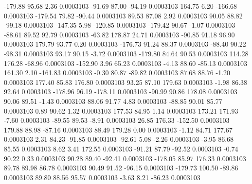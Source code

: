      -179.88       95.68        2.36     0.0003103
      -91.69       87.00      -94.19     0.0003103
      164.75        6.20     -166.68     0.0003103
     -179.54       79.82      -90.44     0.0003103
       89.53       87.08        2.92     0.0003103
       90.05       88.82      -99.18     0.0003103
     -147.35        5.98     -120.85     0.0003103
     -179.42       90.67       -1.07     0.0003103
      -88.61       89.52       92.79     0.0003103
      -63.82      178.87       24.71     0.0003103
      -90.85       91.18       96.90     0.0003103
      179.79       93.77        0.20     0.0003103
     -176.73       91.24       88.37     0.0003103
      -88.40       90.22      -98.31     0.0003103
       93.17       90.15       -3.72     0.0003103
     -179.80       84.64       90.53     0.0003103
      114.28      176.28      -68.96     0.0003103
     -152.90        3.96       65.23     0.0003103
       -4.13       88.60      -85.13     0.0003103
      161.30        2.10     -161.83     0.0003103
       -0.30       80.87      -89.82     0.0003103
       87.68       88.76       -1.20     0.0003103
      177.40       85.83      176.80     0.0003103
       93.25       87.10      179.63     0.0003103
       -1.98       86.38       92.64     0.0003103
     -178.96       96.19     -178.11     0.0003103
      -90.99       90.86      178.08     0.0003103
       90.06       89.51       -1.43     0.0003103
       88.06       91.77        4.83     0.0003103
      -88.85       90.01       85.77     0.0003103
        0.89       90.62        1.32     0.0003103
      177.53       84.95        1.14     0.0003103
      173.21      171.93       -7.60     0.0003103
      -89.55       89.53       -8.91     0.0003103
       26.85      176.33     -152.50     0.0003103
      179.88       88.98      -87.16     0.0003103
       88.49      179.28        0.00     0.0003103
       -1.12       84.71      177.67     0.0003103
        2.31       84.23      -91.85     0.0003103
      -92.61        5.08       -2.26     0.0003103
       -3.95       86.68       85.55     0.0003103
        8.62        3.41      172.55     0.0003103
      -91.21       87.79      -92.52     0.0003103
       -0.74       90.22        0.33     0.0003103
       90.28       89.40      -92.41     0.0003103
     -178.05       85.97      176.33     0.0003103
       89.78       89.98       86.78     0.0003103
       90.49       91.52      -96.15     0.0003103
     -179.73      100.50      -89.86     0.0003103
       89.80       88.56       95.57     0.0003103
       -3.63        8.21      -86.23     0.0003103
